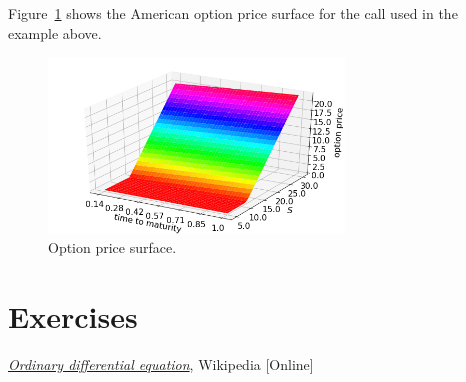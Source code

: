 Figure~\ref{fig:american_call_surface} shows the American option price surface for the call used in the example above.
\begin{figure}[htb]
	\centering
	\includegraphics[width=0.7\textwidth]{figures/american_call_surface}
	\caption{Option price surface.}
	\label{fig:american_call_surface}
\end{figure} 

\section{Exercises}


\begin{thebibliography}{9}
\href{https://en.wikipedia.org/wiki/Ordinary_differential_equation}{\emph{Ordinary differential equation}}, Wikipedia [Online]
\end{thebibliography}


